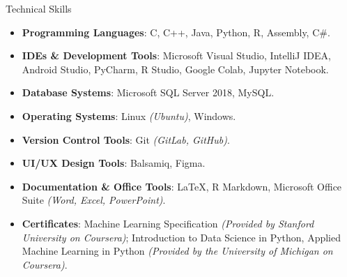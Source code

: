 \documentclass{resume} %
\begin{document}
\begin{rSection}{Technical Skills}
\begin{itemize}
    \item \textbf{Programming Languages}:  C, C++, Java, Python, R, Assembly, C\#.
    \vspace{-0.2cm}\item \textbf{IDEs \& Development Tools}: Microsoft Visual Studio, IntelliJ IDEA, Android Studio, PyCharm, R Studio, Google Colab, Jupyter Notebook.
    \vspace{-0.2cm}\item \textbf{Database Systems}: Microsoft SQL Server 2018, MySQL.
    \vspace{-0.2cm}\item \textbf{Operating Systems}: Linux \textit{(Ubuntu)}, Windows.
    \vspace{-0.2cm}\item \textbf{Version Control Tools}: Git \textit{(GitLab, GitHub)}.
    \vspace{-0.2cm}\item \textbf{UI/UX Design Tools}: Balsamiq, Figma.
    \vspace{-0.2cm}\item \textbf{Documentation \& Office Tools}: \LaTeX, R Markdown, Microsoft Office Suite \textit{(Word, Excel, PowerPoint)}.
    \vspace{-0.2cm}\item \textbf{Certificates}: Machine Learning Specification \textit{(Provided by Stanford University on Coursera)}; Introduction to Data Science in Python, Applied Machine Learning in Python \textit{(Provided by the University of Michigan on Coursera)}.
\end{itemize}

\end{rSection}
\end{document}
